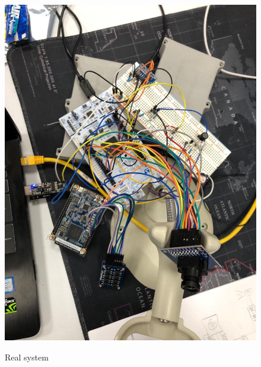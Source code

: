 \begin{figure}[H]
\centering
\includegraphics[scale=.4]{Immagini/02}
\label{02}
\caption{Real system}
\end{figure}